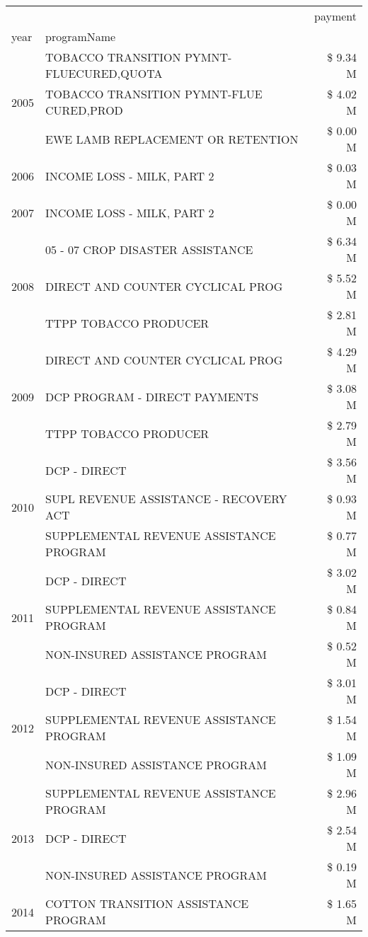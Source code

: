 \begin{tabular}{llr}
\toprule
 &  & payment \\
year & programName &  \\
\midrule
\multirow[t]{3}{*}{2005} & TOBACCO TRANSITION PYMNT-FLUECURED,QUOTA & \$ 9.34 M \\
 & TOBACCO TRANSITION PYMNT-FLUE CURED,PROD & \$ 4.02 M \\
 & EWE LAMB REPLACEMENT OR RETENTION & \$ 0.00 M \\
\cline{1-3}
2006 & INCOME LOSS - MILK, PART 2 & \$ 0.03 M \\
\cline{1-3}
2007 & INCOME LOSS - MILK, PART 2 & \$ 0.00 M \\
\cline{1-3}
\multirow[t]{3}{*}{2008} & 05 - 07 CROP DISASTER ASSISTANCE & \$ 6.34 M \\
 & DIRECT AND COUNTER CYCLICAL PROG & \$ 5.52 M \\
 & TTPP TOBACCO PRODUCER & \$ 2.81 M \\
\cline{1-3}
\multirow[t]{3}{*}{2009} & DIRECT AND COUNTER CYCLICAL PROG & \$ 4.29 M \\
 & DCP PROGRAM - DIRECT PAYMENTS & \$ 3.08 M \\
 & TTPP TOBACCO PRODUCER & \$ 2.79 M \\
\cline{1-3}
\multirow[t]{3}{*}{2010} & DCP - DIRECT & \$ 3.56 M \\
 & SUPL REVENUE ASSISTANCE - RECOVERY ACT & \$ 0.93 M \\
 & SUPPLEMENTAL REVENUE ASSISTANCE PROGRAM & \$ 0.77 M \\
\cline{1-3}
\multirow[t]{3}{*}{2011} & DCP - DIRECT & \$ 3.02 M \\
 & SUPPLEMENTAL REVENUE ASSISTANCE PROGRAM & \$ 0.84 M \\
 & NON-INSURED ASSISTANCE PROGRAM & \$ 0.52 M \\
\cline{1-3}
\multirow[t]{3}{*}{2012} & DCP - DIRECT & \$ 3.01 M \\
 & SUPPLEMENTAL REVENUE ASSISTANCE PROGRAM & \$ 1.54 M \\
 & NON-INSURED ASSISTANCE PROGRAM & \$ 1.09 M \\
\cline{1-3}
\multirow[t]{3}{*}{2013} & SUPPLEMENTAL REVENUE ASSISTANCE PROGRAM & \$ 2.96 M \\
 & DCP - DIRECT & \$ 2.54 M \\
 & NON-INSURED ASSISTANCE PROGRAM & \$ 0.19 M \\
\cline{1-3}
\multirow[t]{3}{*}{2014} & COTTON TRANSITION ASSISTANCE PROGRAM & \$ 1.65 M \\

\end{tabular}
